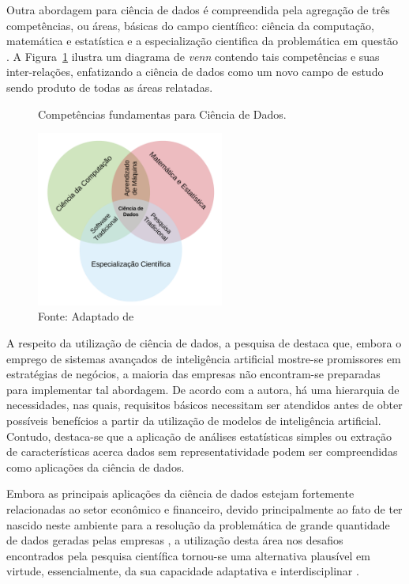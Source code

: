 Outra abordagem para ciência de dados é compreendida pela agregação de três competências, ou áreas, básicas do campo científico: ciência da computação, matemática e estatística e a especialização cientifica da problemática em questão \cite{cap02_ref2}. A Figura~\ref{fig:veen_diagram} ilustra um diagrama de \textit{venn} contendo tais competências e suas inter-relações, enfatizando a ciência de dados como um novo campo de estudo sendo produto de todas as áreas relatadas.

\begin{figure}[!h]
   \centering
   \caption{Competências fundamentas para Ciência de Dados.}
   \includegraphics[width=0.55\textwidth]{figs/cap02_diagrama_veen_ds.png}
   \caption*{\footnotesize{Fonte: Adaptado de \cite{cap02_ref2}}}
   \label{fig:veen_diagram}
\end{figure}

A respeito da utilização de ciência de dados, a pesquisa de \cite{cap02_ref35} destaca que, embora o emprego de sistemas avançados de inteligência artificial mostre-se promissores em estratégias de negócios, a maioria das empresas não encontram-se preparadas para implementar tal abordagem. De acordo com a autora, há uma hierarquia de necessidades, nas quais, requisitos básicos necessitam ser atendidos antes de obter possíveis benefícios a partir da utilização de modelos de inteligência artificial. Contudo, destaca-se que a aplicação de análises estatísticas simples ou extração de características acerca dados sem representatividade podem ser compreendidas como aplicações da ciência de dados. 

Embora as principais aplicações da ciência de dados estejam fortemente relacionadas ao setor econômico e financeiro, devido principalmente ao fato de ter nascido neste ambiente para a resolução da problemática de grande quantidade de dados geradas pelas empresas \cite{cap02_ref9}, a utilização desta área nos desafios encontrados pela pesquisa científica tornou-se uma alternativa plausível em virtude, essencialmente, da sua capacidade adaptativa e interdisciplinar \cite{cap02_ref2}.

